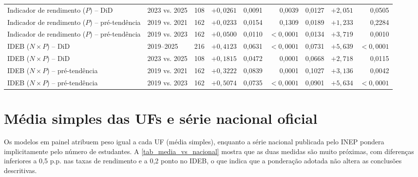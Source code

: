 \begin{apendicesenv}
\begin{landscape}
{\begin{longtable}{p{5.6cm} p{2.6cm} c r r r r r r}
        Indicador de rendimento ($P$) -- DiD    & 2023 vs. 2025    & 108 & $+0{,}0261$  & 0,0091 & 0,0039      & 0,0127 & $+2{,}051$ & 0,0505 \\
        Indicador de rendimento ($P$) -- pré-tendência & 2019 vs. 2021 & 162 & $+0{,}0233$ & 0,0154 & 0,1309   & 0,0189 & $+1{,}233$ & 0,2284 \\
        Indicador de rendimento ($P$) -- pré-tendência & 2019 vs. 2023 & 162 & $+0{,}0500$ & 0,0110 & $<0{,}0001$ & 0,0134 & $+3{,}719$ & 0,0010 \\
        \addlinespace
        IDEB ($N \times P$) -- DiD              & 2019--2025       & 216 & $+0{,}4123$  & 0,0631 & $<0{,}0001$ & 0,0731 & $+5{,}639$ & $<0{,}0001$ \\
        IDEB ($N \times P$) -- DiD              & 2023 vs. 2025    & 108 & $+0{,}1815$  & 0,0472 & 0,0001      & 0,0668 & $+2{,}718$ & 0,0115 \\
        IDEB ($N \times P$) -- pré-tendência    & 2019 vs. 2021    & 162 & $+0{,}3222$  & 0,0839 & 0,0001      & 0,1027 & $+3{,}136$ & 0,0042 \\
        IDEB ($N \times P$) -- pré-tendência    & 2019 vs. 2023    & 162 & $+0{,}5074$  & 0,0735 & $<0{,}0001$ & 0,0901 & $+5{,}634$ & $<0{,}0001$ \\
    \end{longtable}
    }
    \end{landscape}


    \chapter{Média simples das UFs e série nacional oficial}
    \label{chap_apendice_serie_nacional}

    Os modelos em painel atribuem peso igual a cada UF (média simples), enquanto a série nacional publicada pelo INEP pondera implicitamente pelo número de estudantes.
    A \autoref{tab_media_vs_nacional} mostra que as duas medidas são muito próximas, com diferenças inferiores a 0,5 p.p. nas taxas de rendimento e a 0,2 ponto no IDEB, o que indica que a ponderação adotada não altera as conclusões descritivas.


\end{apendicesenv}
